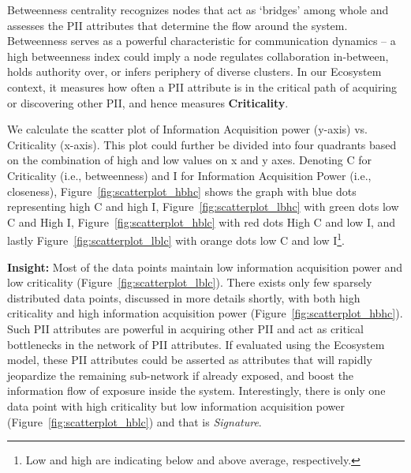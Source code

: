\documentclass[conference]{IEEEtran}
\begin{document}
Betweenness centrality recognizes nodes that act as `bridges' among whole and assesses the PII attributes that determine the flow around the system. Betweenness serves as a powerful characteristic for communication dynamics -- a high betweenness index could imply a node regulates collaboration in-between, holds authority over,  or infers periphery of diverse clusters. In our Ecosystem context, it measures how often a PII attribute is in the critical path of acquiring or discovering other PII, and hence measures {\bf Criticality}.




We calculate the scatter plot of Information Acquisition power (y-axis) vs. Criticality (x-axis).  This plot could further be divided into four quadrants based on the combination of high and low values on x and y axes. Denoting C for Criticality (i.e., betweenness) and I for  Information Acquisition Power (i.e., closeness), Figure~\ref{fig:scatterplot_hbhc} shows the graph with blue dots representing high C and high I, Figure~\ref{fig:scatterplot_lbhc} with green dots low C and High I, Figure~\ref{fig:scatterplot_hblc} with red dots High C and low I, and lastly Figure~\ref{fig:scatterplot_lblc} with orange dots low C and low I\footnote{Low and high are indicating below and above average, respectively.}. 

{\bf Insight:} Most of the data points maintain low information acquisition power and low criticality (Figure~\ref{fig:scatterplot_lblc}). There exists only few sparsely distributed data points, discussed in more details shortly, with both high criticality and high information acquisition power (Figure~\ref{fig:scatterplot_hbhc}). Such PII attributes are powerful in acquiring other PII and act as critical bottlenecks in the network of PII attributes. If evaluated using the Ecosystem model, these PII attributes could be asserted as attributes that will rapidly jeopardize the remaining sub-network if already exposed, and boost the information flow of exposure inside the system. Interestingly, there is only one data point with high criticality but low information acquisition power (Figure~\ref{fig:scatterplot_hblc}) and that is {\it Signature}.
\end{document}
